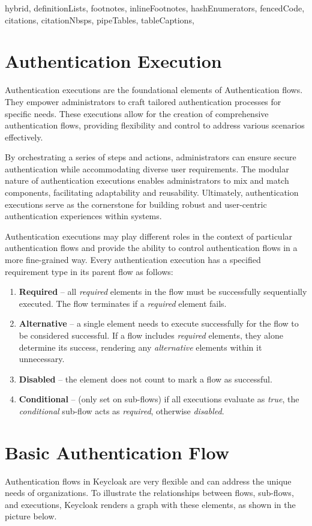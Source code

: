 \documentclass[
  digital,     %
  oneside,     %
  nosansbold,  %
  nocolorbold, %
  lof,         %
  lot,         %
]{fithesis4}
\begin{document}
\begin{markdown*}{%
  hybrid,
  definitionLists,
  footnotes,
  inlineFootnotes,
  hashEnumerators,
  fencedCode,
  citations,
  citationNbsps,
  pipeTables,
  tableCaptions,
}
\newpage
\section{Authentication Execution}
Authentication executions are the foundational elements of Authentication flows.
They empower administrators to craft tailored authentication processes for specific needs.
These executions allow for the creation of comprehensive authentication flows, providing flexibility and control to address various scenarios effectively.

By orchestrating a series of steps and actions, administrators can ensure secure authentication while accommodating diverse user requirements.
The modular nature of authentication executions enables administrators to mix and match components, facilitating adaptability and reusability.
Ultimately, authentication executions serve as the cornerstone for building robust and user-centric authentication experiences within systems.

Authentication executions may play different roles in the context of particular authentication flows and provide the ability to control authentication flows in a more fine-grained way. \cite{keycloak-auth-flows}
\newline
\newline
Every authentication execution has a specified requirement type in its parent flow as follows:

\begin{enumerate}
    \item \textbf{Required} -- all \textit{required} elements in the flow must be successfully sequentially executed. The flow terminates if a \textit{required} element fails.
    \item \textbf{Alternative} -- a single element needs to execute successfully for the flow to be considered successful. If a flow includes \textit{required} elements, they alone determine its success, rendering any \textit{alternative} elements within it unnecessary.
    \item \textbf{Disabled} -- the element does not count to mark a flow as successful.
    \item \textbf{Conditional} -- (only set on sub-flows) if all executions evaluate as \textit{true}, the \textit{conditional} sub-flow acts as \textit{required}, otherwise \textit{disabled}.
\end{enumerate}

\newpage

\section{Basic Authentication Flow}
Authentication flows in Keycloak are very flexible and can address the unique needs of organizations.
To illustrate the relationships between flows, sub-flows, and executions, Keycloak renders a graph with these elements, as shown in the picture below.


\end{markdown*}
\end{document}
